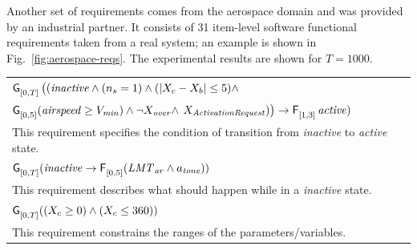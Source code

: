 \documentclass[acmsmall,screen]{acmart}
\begin{document}
Another set of requirements comes from the aerospace domain and was provided by an industrial partner. It consists of 31 item-level software functional requirements taken from a real system; an example is shown in Fig.~\ref{fig:aerospace-reqs}.
The experimental results are shown for $T=1000$.

\begin{stlbox}[
    float,
    title={Example of STL Requirements from an industrial aerospace project.},
    label={fig:aerospace-reqs}
]
\renewcommand{\arraystretch}{1.1} %
\footnotesize
\begin{tabular}{p{13cm}} %
    $\mathop{\mathsf{\mathsf{G}}^{{}}_{[0,T]}} \big( (\mathit{inactive} \wedge (n_s =1)  \wedge (|X_c - X_b |\leq 5) \wedge $\\$ \mathop{\mathsf{\mathsf{G}}^{{}}_{[0,5]}}(\mathit{airspeed} \geq V_\mathit{min}) \wedge \neg X_\mathit{over} \wedge$ $X_\mathit{ActivationRequest}) \big)\rightarrow \mathop{\mathsf{\mathsf{F}}^{{}}_{[1,3]}} \mathit{active})$ \\
    This requirement specifies the condition of transition from \emph{inactive} to \emph{active} state. \\
    
    \midrule

    $\mathop{\mathsf{\mathsf{G}}^{{}}_{[0,T]}}(\mathit{inactive} \rightarrow \mathop{\mathsf{\mathsf{F}}^{{}}_{[0,5]}} (\mathit{LMT}_\mathit{ar} \wedge a_\mathit{tone}))$ \\
    This requirement describes what should happen while in a \emph{inactive} state. \\

    \midrule

    $\mathop{\mathsf{\mathsf{G}}^{{}}_{[0,T]}}((X_c \geq 0) \wedge (X_c \leq 360))$ \\
    This requirement constrains the ranges of the parameters/variables. \\
\end{tabular}
\end{stlbox}
\end{document}
